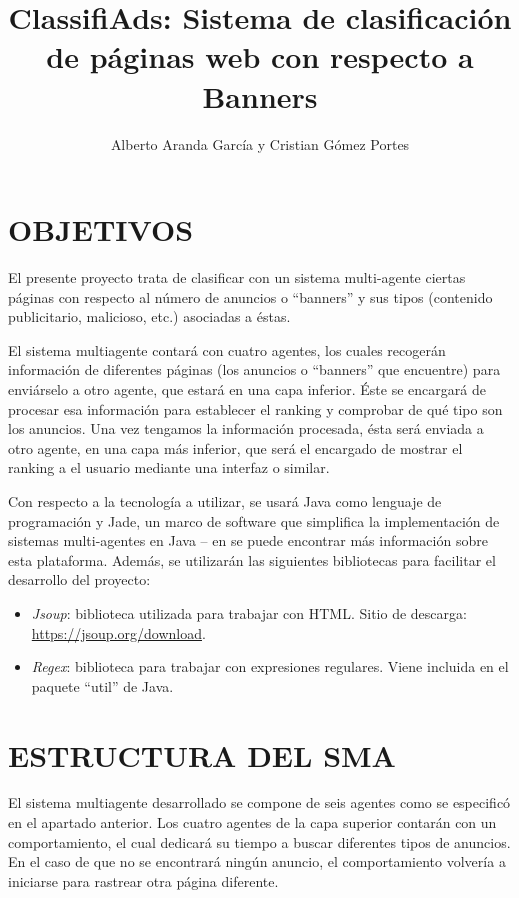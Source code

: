 \documentclass{pre-tfg}
\title{ClassifiAds: Sistema de clasificación de páginas web con respecto a Banners}
\author{Alberto Aranda García y Cristian Gómez Portes}
\begin{document}
\maketitle
\tableofcontents
\pagebreak
\listoffigures
\pagebreak
\lstlistoflistings

\newpage

\section{OBJETIVOS}

El presente proyecto trata de clasificar con un sistema multi-agente ciertas páginas con respecto al número de anuncios o ``banners'' y sus tipos (contenido publicitario, malicioso, etc.) asociadas a éstas.

El sistema multiagente contará con cuatro agentes, los cuales recogerán información de diferentes páginas (los anuncios o ``banners'' que encuentre) para enviárselo a otro agente, que estará en una capa inferior. Éste se encargará de procesar esa información para establecer el ranking y comprobar de qué tipo son los anuncios. Una vez tengamos la información procesada, ésta será enviada a otro agente, en una capa más inferior, que será el encargado de mostrar el ranking a el usuario mediante una interfaz o similar.

Con respecto a la tecnología a utilizar, se usará Java como lenguaje de programación y Jade, un marco de software que simplifica la implementación de sistemas multi-agentes en Java -- en \cite{bellifemine2002jade} se puede encontrar más información sobre esta plataforma. Además, se utilizarán las siguientes bibliotecas para facilitar el desarrollo del proyecto:

\begin{itemize}
 \item \textit{Jsoup}: biblioteca utilizada para trabajar con HTML. Sitio de descarga: \url{https://jsoup.org/download}.
\item  \textit{Regex}: biblioteca para trabajar con expresiones regulares. Viene incluida en el paquete ``util'' de Java.
\end{itemize}

\section{ESTRUCTURA DEL SMA}
El sistema multiagente desarrollado se compone de seis agentes como se especificó en el apartado anterior. Los cuatro agentes de la capa superior contarán con un comportamiento, el cual dedicará su tiempo a buscar diferentes tipos de anuncios. En el caso de que no se encontrará ningún anuncio, el comportamiento volvería a iniciarse para rastrear otra página diferente.
\end{document}
